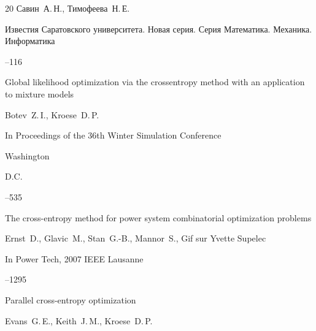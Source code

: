 \begin{thebibliography}{20}
\by Савин~А.\,Н., Тимофеева~Н.\,Е.

\jour Известия Саратовского университета. Новая серия. Серия Математика. Механика. Информатика




--116





\paper Global likelihood optimization via the crossentropy method with an application to mixture models

\by Botev~Z.\,I., Kroese~D.\,P.

\inbook In Proceedings of the 36th Winter Simulation Conference

\publaddr Washington

\publ D.C.


--535





\paper The cross-entropy method for power system combinatorial optimization problems

\by Ernst~D., Glavic~M., Stan~G.-B., Mannor~S., Gif sur Yvette Supelec

\jour In Power Tech, 2007 IEEE Lausanne


--1295





\paper Parallel cross-entropy optimization

\by Evans~G.\,E., Keith~J.\,M., Kroese~D.\,P.


\end{thebibliography}
